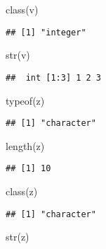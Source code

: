 \documentclass[
]{article}
\newenvironment{Shaded}{\begin{snugshade}}{\end{snugshade}}
\newcommand{\FunctionTok}[1]{\textcolor[rgb]{0.00,0.00,0.00}{#1}}
\newcommand{\NormalTok}[1]{#1}
\begin{document}
\begin{Shaded}
\begin{Highlighting}[]
\FunctionTok{class}\NormalTok{(v)}
\end{Highlighting}
\end{Shaded}

\begin{verbatim}
## [1] "integer"
\end{verbatim}

\begin{Shaded}
\begin{Highlighting}[]
\FunctionTok{str}\NormalTok{(v)}
\end{Highlighting}
\end{Shaded}

\begin{verbatim}
##  int [1:3] 1 2 3
\end{verbatim}

\begin{Shaded}
\begin{Highlighting}[]
\FunctionTok{typeof}\NormalTok{(z)}
\end{Highlighting}
\end{Shaded}

\begin{verbatim}
## [1] "character"
\end{verbatim}

\begin{Shaded}
\begin{Highlighting}[]
\FunctionTok{length}\NormalTok{(z)}
\end{Highlighting}
\end{Shaded}

\begin{verbatim}
## [1] 10
\end{verbatim}

\begin{Shaded}
\begin{Highlighting}[]
\FunctionTok{class}\NormalTok{(z)}
\end{Highlighting}
\end{Shaded}

\begin{verbatim}
## [1] "character"
\end{verbatim}

\begin{Shaded}
\begin{Highlighting}[]
\FunctionTok{str}\NormalTok{(z)}
\end{Highlighting}
\end{Shaded}
\end{document}
